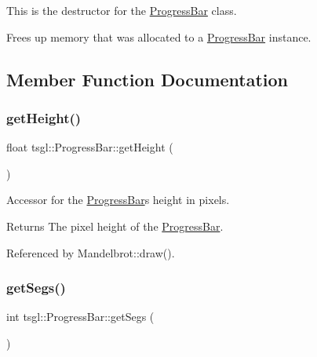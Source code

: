 This is the destructor for the \hyperlink{classtsgl_1_1_progress_bar}{Progress\+Bar} class.

Frees up memory that was allocated to a \hyperlink{classtsgl_1_1_progress_bar}{Progress\+Bar} instance. 

\subsection{Member Function Documentation}
\mbox{\label{classtsgl_1_1_progress_bar_a07b0b55587b0b05b09d1ccf61602dc4e}} 
\subsubsection{\texorpdfstring{get\+Height()}{getHeight()}}
{\footnotesize\ttfamily float tsgl\+::\+Progress\+Bar\+::get\+Height (\begin{DoxyParamCaption}{ }\end{DoxyParamCaption})\hspace{0.3cm}{\ttfamily [inline]}}



Accessor for the \hyperlink{classtsgl_1_1_progress_bar}{Progress\+Bar}\textquotesingle{}s height in pixels. 

\begin{DoxyReturn}{Returns}
The pixel height of the \hyperlink{classtsgl_1_1_progress_bar}{Progress\+Bar}. 
\end{DoxyReturn}


Referenced by Mandelbrot\+::draw().

\mbox{\label{classtsgl_1_1_progress_bar_a25576903783f18f8d74570aed2f80d95}} 
\subsubsection{\texorpdfstring{get\+Segs()}{getSegs()}}
{\footnotesize\ttfamily int tsgl\+::\+Progress\+Bar\+::get\+Segs (\begin{DoxyParamCaption}{ }\end{DoxyParamCaption})\hspace{0.3cm}{\ttfamily [inline]}}



